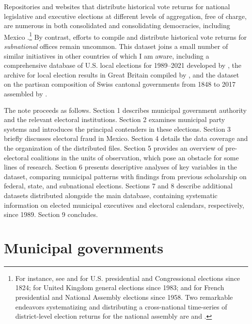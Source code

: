 \documentclass[letter,12pt]{article}
\begin{document}
Repositories and websites that distribute historical vote returns for national legislative and executive elections at different levels of aggregation, free of charge, are numerous in both consolidated and consolidating democracies, including Mexico \citep{ife.2026}.\footnote{For instance, see \citet{mit.election.data.2017} and \citet{icpsr.us.hist.el.ret.2025} for U.S. presidential and Congressional elections since 1824; \citet{commons.library.uk.els.2023} for United Kingdom general elections since 1983; \citet{interieur.2026} and \citet{gougou.2025} for French presidential and National Assembly elections since 1958. Two remarkable endeavors systematizing and distributing a cross-national time-series of district-level election returns for the national assembly are \citet{lea.2009} and \citet{clea.2024}.} By contrast, efforts to compile and distribute historical vote returns for \emph{subnational} offices remain uncommon. This dataset joins a small number of similar initiatives in other countries of which I am aware, including a comprehensive database of U.S. local elections for 1989--2021 developed by \citet{am-loc-gov-els-database.2023}, the archive for local election results in Great Britain compiled by \citet{teale-loc-els-uk.2026}, and the dataset on the partisan composition of Swiss cantonal governments from 1848 to 2017 assembled by \citet{walter-emmenegger-Party-cantons-2018}. 

The note proceeds as follows. Section 1 describes municipal government authority and the relevant electoral institutions. Section 2 examines municipal party systems and introduces the principal contenders in these elections. Section 3 briefly discusses electoral fraud in Mexico. Section 4 details the data coverage and the organization of the distributed files. Section 5 provides an overview of pre-electoral coalitions in the units of observation, which pose an obstacle for some lines of research. Section 6 presents descriptive analyses of key variables in the dataset, comparing municipal patterns with findings from previous scholarship on federal, state, and subnational elections. Sections 7 and 8 describe additional datasets distributed alongside the main database, containing systematic information on elected municipal executives and electoral calendars, respectively, since 1989. Section 9 concludes.

\section{Municipal governments}
\end{document}
